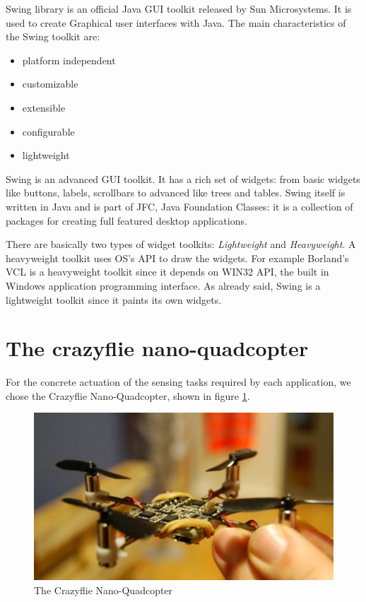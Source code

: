 Swing library is an official Java GUI toolkit released by Sun Microsystems. It is used to create Graphical user interfaces with Java.
The main characteristics of the Swing toolkit are:
\begin{itemize}
\item platform independent
\item customizable
\item extensible
\item configurable
\item lightweight
\end{itemize}

Swing is an advanced GUI toolkit. It has a rich set of widgets:
from basic widgets like buttons, labels, scrollbars to advanced like trees and tables. 
Swing itself is written in Java and is part of JFC, Java Foundation Classes: it is a collection of packages for creating full featured desktop applications.

There are basically two types of widget toolkits: \textit{Lightweight} and \textit{Heavyweight}.
A heavyweight toolkit uses OS's API to draw the widgets. For example Borland's VCL is a heavyweight toolkit since it depends on WIN32 API, the built in Windows application programming interface.
As already said, Swing is a lightweight toolkit since it paints its own widgets.

\section{The crazyflie nano-quadcopter}\label{crazyflie}

For the concrete actuation of the sensing tasks required by each application, we chose the Crazyflie Nano-Quadcopter, shown in figure \ref{fig:crazyflie}.


\begin{figure}[H]
\centering
\includegraphics[width=\linewidth]
{pictures/crazyflie.jpg}
  \caption{The Crazyflie Nano-Quadcopter}
  \label{fig:crazyflie}
\end{figure}

